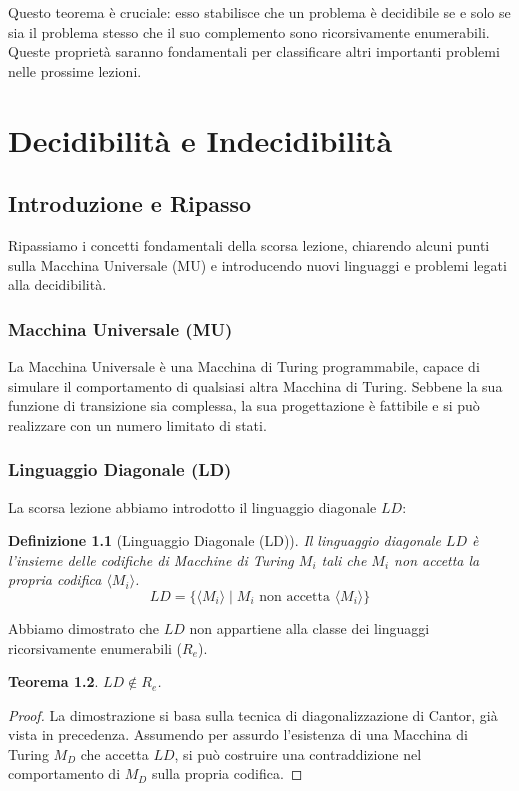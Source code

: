 \documentclass[a4paper, 11pt]{book} %
\newtheorem{theorem}{Teorema}[section]
\newtheorem{definition}[theorem]{Definizione}
\theoremstyle{definition}
\begin{document}
Questo teorema è cruciale: esso stabilisce che un problema è decidibile se e solo se sia il problema stesso che il suo complemento sono ricorsivamente enumerabili. Queste proprietà saranno fondamentali per classificare altri importanti problemi nelle prossime lezioni.



\chapter{Decidibilità e Indecidibilità}



\section{Introduzione e Ripasso}
Ripassiamo i concetti fondamentali della scorsa lezione, chiarendo alcuni punti sulla Macchina Universale (MU) e introducendo nuovi linguaggi e problemi legati alla decidibilità.

\subsection{Macchina Universale (MU)}
La Macchina Universale è una Macchina di Turing programmabile, capace di simulare il comportamento di qualsiasi altra Macchina di Turing. Sebbene la sua funzione di transizione sia complessa, la sua progettazione è fattibile e si può realizzare con un numero limitato di stati.

\subsection{Linguaggio Diagonale (LD)}
La scorsa lezione abbiamo introdotto il linguaggio diagonale $LD$:
\begin{definition}[Linguaggio Diagonale (LD)]
Il linguaggio diagonale $LD$ è l'insieme delle codifiche di Macchine di Turing $M_i$ tali che $M_i$ non accetta la propria codifica $\langle M_i \rangle$.
\[ LD = \{ \langle M_i \rangle \mid M_i \text{ non accetta } \langle M_i \rangle \} \]
\end{definition}

Abbiamo dimostrato che $LD$ non appartiene alla classe dei linguaggi ricorsivamente enumerabili ($R_e$).
\begin{theorem}
$LD \notin R_e$.
\end{theorem}
\begin{proof}
La dimostrazione si basa sulla tecnica di diagonalizzazione di Cantor, già vista in precedenza. Assumendo per assurdo l'esistenza di una Macchina di Turing $M_D$ che accetta $LD$, si può costruire una contraddizione nel comportamento di $M_D$ sulla propria codifica.
\end{proof}
\end{document}
